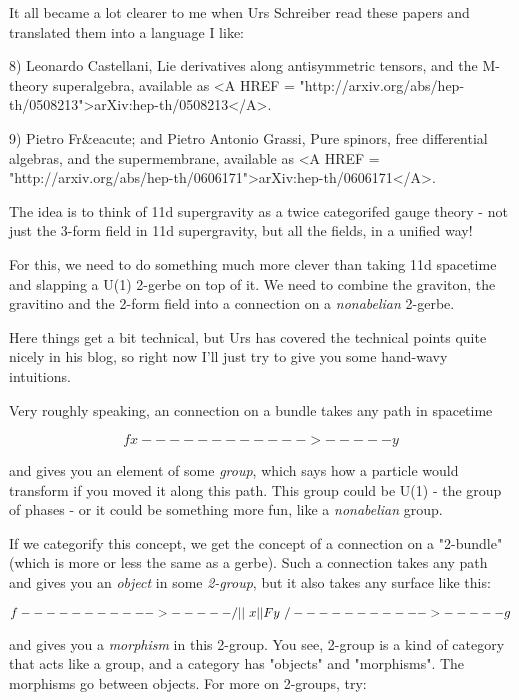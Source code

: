 It all became a lot clearer to me when Urs Schreiber read 
these papers and translated them into a language I like:

8) Leonardo Castellani, Lie derivatives along antisymmetric 
tensors, and the M-theory superalgebra, available as <A HREF = "http://arxiv.org/abs/hep-th/0508213">arXiv:hep-th/0508213</A>.

9) Pietro Fr&eacute; and Pietro Antonio Grassi, Pure spinors, 
free differential algebras, and the supermembrane, available
as <A HREF = "http://arxiv.org/abs/hep-th/0606171">arXiv:hep-th/0606171</A>.

The idea is to think of 11d supergravity as a twice categorifed
gauge theory - not just the 3-form field in 11d supergravity,
but all the fields, in a unified way!  

For this, we need to do something much more clever than taking
11d spacetime and slapping a U(1) 2-gerbe on top of it.  We 
need to combine the graviton, the gravitino and the 2-form field 
into a connection on a \emph{nonabelian} 2-gerbe.  

Here things get a bit technical, but Urs has covered the technical
points quite nicely in his blog, so right now I'll just try to
give you some hand-wavy intuitions.

Very roughly speaking, an connection on a bundle takes any path 
in spacetime


$$

             f
  x------------>-----y    
$$
    
and gives you an element of some \emph{group}, which says how a particle
would transform if you moved it along this path.  This group could
be U(1) - the group of phases - or it could be something more fun,
like a \emph{nonabelian} group.  

If we categorify this concept, we get the concept of a connection
on a "2-bundle" (which is more or less the same as a gerbe).  Such
a connection takes any path and gives you an \emph{object} in some 
\emph{2-group}, 
but it also takes any surface like this:


$$

              f
    ----------->-----
   /        ||       \
  x         ||F       y  
   \        \/       /  
    ----------->-----
               g
$$
    
and gives you a \emph{morphism} in this 2-group.  You see, 2-group
is a kind of category that acts like a group, and a category 
has "objects" and "morphisms".  The morphisms go between objects.  
For more on 2-groups, try:

